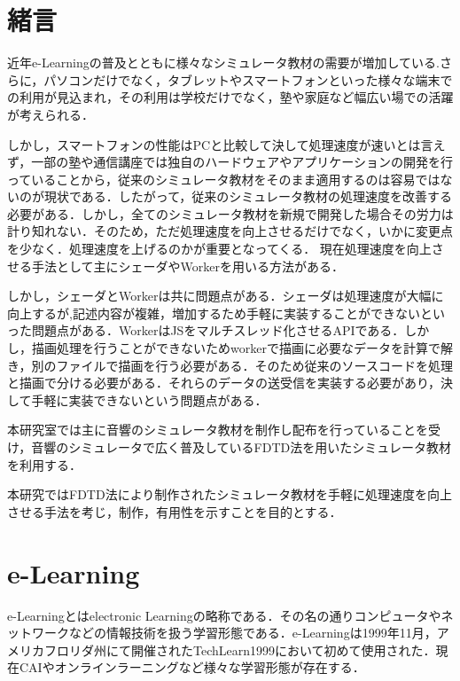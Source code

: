 \documentclass[a4j,12pt]{jsarticle}
\begin{document}
\setcounter{page}{1} %
\setcounter{tocdepth}{3}
\tableofcontents
\clearpage

\newpage
{}
\setcounter{page}{1} 
\section{緒言}
近年e-Learningの普及とともに様々なシミュレータ教材の需要が増加している.さらに，パソコンだけでなく，タブレットやスマートフォンといった様々な端末での利用が見込まれ，その利用は学校だけでなく，塾や家庭など幅広い場での活躍が考えられる．

しかし，スマートフォンの性能はPCと比較して決して処理速度が速いとは言えず，一部の塾や通信講座では独自のハードウェアやアプリケーションの開発を行っていることから，従来のシミュレータ教材をそのまま適用するのは容易ではないのが現状である．したがって，従来のシミュレータ教材の処理速度を改善する必要がある．しかし，全てのシミュレータ教材を新規で開発した場合その労力は計り知れない．そのため，ただ処理速度を向上させるだけでなく，いかに変更点を少なく．処理速度を上げるのかが重要となってくる．
現在処理速度を向上させる手法として主にシェーダやWorkerを用いる方法がある．

しかし，シェーダとWorkerは共に問題点がある．シェーダは処理速度が大幅に向上するが,記述内容が複雑，増加するため手軽に実装することができないといった問題点がある．WorkerはJSをマルチスレッド化させるAPIである．しかし，描画処理を行うことができないためworkerで描画に必要なデータを計算で解き，別のファイルで描画を行う必要がある．そのため従来のソースコードを処理と描画で分ける必要がある．それらのデータの送受信を実装する必要があり，決して手軽に実装できないという問題点がある．

本研究室では主に音響のシミュレータ教材を制作し配布を行っていることを受け，音響のシミュレータで広く普及しているFDTD法を用いたシミュレータ教材を利用する．


本研究ではFDTD法により制作されたシミュレータ教材を手軽に処理速度を向上させる手法を考じ，制作，有用性を示すことを目的とする．

\newpage
\section{e-Learning}
e-Learningとはelectronic Learningの略称である．その名の通りコンピュータやネットワークなどの情報技術を扱う学習形態である．e-Learningは1999年11月，アメリカフロリダ州にて開催されたTechLearn1999において初めて使用された．現在CAIやオンラインラーニングなど様々な学習形態が存在する． 
\end{document}
